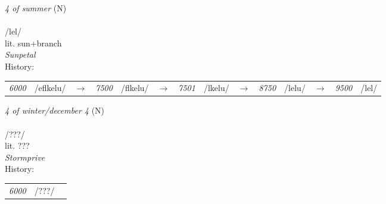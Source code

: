 \vspace{15pt}
\begin{nopagebreak}
 \textit{4 of summer} (N)\\
\\
\noindent /l{\textprimstress}el/\\
\noindent lit. sun+branch\\
\noindent \textit{Sunpetal}\\


\noindent History:

\vspace{-0pt}
\hspace{40pt}
\begin{tabular}{ccc}
\textit{6000} & /eflkelu/&$\rightarrow$ & \textit{7500} & /flkelu/&$\rightarrow$ & \textit{7501} & /lkelu/&$\rightarrow$ & \textit{8750} & /lelu/&$\rightarrow$ & \textit{9500} & /lel/& \\
\end{tabular}

\vspace{20pt}\hline

\end{nopagebreak}
\filbreak



\vspace{15pt}
\begin{nopagebreak}
 \textit{4 of winter/december 4} (N)\\
\\
\noindent /???/\\
\noindent lit. ???\\
\noindent \textit{Stormprive}\\


\noindent History:

\vspace{-0pt}
\hspace{40pt}
\begin{tabular}{ccc}
\textit{6000} & /???/& \\
\end{tabular}

\vspace{20pt}\hline

\end{nopagebreak}
\filbreak



